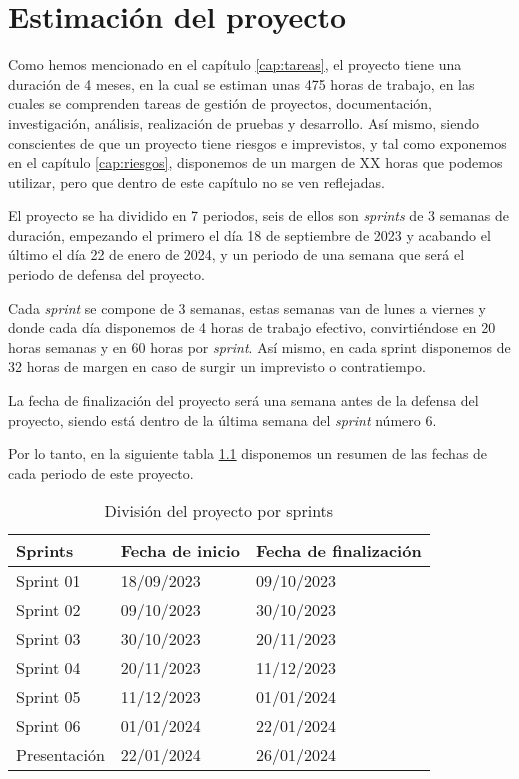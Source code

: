 \chapter{Estimación del proyecto}
\label{cap:estimacion}


Como hemos mencionado en el capítulo \ref{cap:tareas}, el proyecto tiene una duración de 4 meses, en la cual se estiman unas 475 horas de trabajo, en las cuales se
comprenden tareas de gestión de proyectos, documentación, investigación, análisis, realización de pruebas y desarrollo. Así mismo, siendo conscientes de que un proyecto
tiene riesgos e imprevistos, y tal como exponemos en el capítulo \ref{cap:riesgos}, disponemos de un margen de XX horas que podemos utilizar, pero que dentro de este
capítulo no se ven reflejadas.

El proyecto se ha dividido en 7 periodos, seis de ellos son \textit{sprints} de 3 semanas de duración, empezando el primero el día 18 de septiembre de 2023 y acabando el último
el día 22 de enero de 2024, y un periodo de una semana que será el periodo de defensa del proyecto.

Cada \textit{sprint} se compone de 3 semanas, estas semanas van de lunes a viernes y donde cada día disponemos de 4 horas de trabajo efectivo, convirtiéndose en 20 horas semanas
y en 60 horas por \textit{sprint}. Así mismo, en cada sprint disponemos de 32 horas de margen en caso de surgir un imprevisto o contratiempo.

La fecha de finalización del proyecto será una semana antes de la defensa del proyecto, siendo está dentro de la última semana del \textit{sprint} número 6.

Por lo tanto, en la siguiente tabla \ref{tab:proyecto_estimacion} disponemos un resumen de las fechas de cada periodo de este proyecto.

\begin{table}[H]
    \centering
    \begin{tabular}{|l|l|l|}
    \hline
    \rowcolor[HTML]{8EA9D8} 
    Sprints      & Fecha de inicio & Fecha de finalización \\ \hline
    Sprint 01    & 18/09/2023      & 09/10/2023            \\ \hline
    Sprint 02    & 09/10/2023      & 30/10/2023            \\ \hline
    Sprint 03    & 30/10/2023      & 20/11/2023            \\ \hline
    Sprint 04    & 20/11/2023      & 11/12/2023            \\ \hline
    Sprint 05    & 11/12/2023      & 01/01/2024            \\ \hline
    Sprint 06    & 01/01/2024      & 22/01/2024            \\ \hline
    Presentación & 22/01/2024      & 26/01/2024            \\ \hline
    \end{tabular}
    \caption{División del proyecto por sprints}
    \label{tab:proyecto_estimacion}
\end{table}

